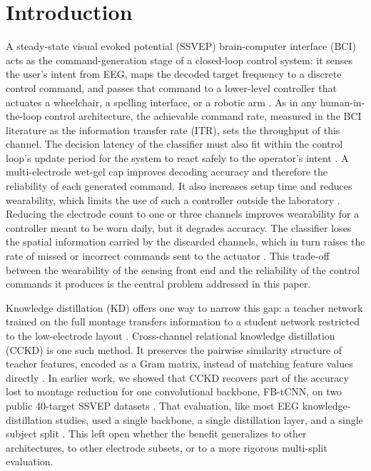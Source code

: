 \documentclass[11pt,a4paper,twoside,asymmetric]{article}
\begin{document}
\section{Introduction}

A steady-state visual evoked potential (SSVEP) brain-computer interface (BCI) acts as the command-generation stage of a closed-loop control system: it senses the user's intent from EEG, maps the decoded target frequency to a discrete control command, and passes that command to a lower-level controller that actuates a wheelchair, a spelling interface, or a robotic arm \cite{R3,R6,R7,R8,R9}. As in any human-in-the-loop control architecture, the achievable command rate, measured in the BCI literature as the information transfer rate (ITR), sets the throughput of this channel. The decision latency of the classifier must also fit within the control loop's update period for the system to react safely to the operator's intent \cite{R4,R5}. A multi-electrode wet-gel cap improves decoding accuracy and therefore the reliability of each generated command. It also increases setup time and reduces wearability, which limits the use of such a controller outside the laboratory \cite{R39,R40,R41}. Reducing the electrode count to one or three channels improves wearability for a controller meant to be worn daily, but it degrades accuracy. The classifier loses the spatial information carried by the discarded channels, which in turn raises the rate of missed or incorrect commands sent to the actuator \cite{R36,R38}. This trade-off between the wearability of the sensing front end and the reliability of the control commands it produces is the central problem addressed in this paper.

Knowledge distillation (KD) offers one way to narrow this gap: a teacher network trained on the full montage transfers information to a student network restricted to the low-electrode layout \cite{R47}. Cross-channel relational knowledge distillation (CCKD) is one such method. It preserves the pairwise similarity structure of teacher features, encoded as a Gram matrix, instead of matching feature values directly \cite{R82}. In earlier work, we showed that CCKD recovers part of the accuracy lost to montage reduction for one convolutional backbone, FB-tCNN, on two public 40-target SSVEP datasets \cite{R82,R16}. That evaluation, like most EEG knowledge-distillation studies, used a single backbone, a single distillation layer, and a single subject split \cite{R48,R49,R50,R51,R52,R53}. This left open whether the benefit generalizes to other architectures, to other electrode subsets, or to a more rigorous multi-split evaluation.
\end{document}
